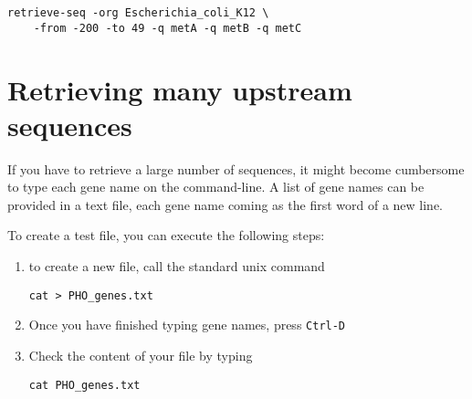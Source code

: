 {\color{blue} \begin{footnotesize}
\begin{verbatim}
retrieve-seq -org Escherichia_coli_K12 \
    -from -200 -to 49 -q metA -q metB -q metC
\end{verbatim} \end{footnotesize}
}

\section{Retrieving many upstream sequences}

If you have to retrieve a large number of sequences, it might become
cumbersome to type each gene name on the command-line. A list of gene
names can be provided in a text file, each gene name coming as the
first word of a new line.

To create a test file, you can execute the following steps:
\begin{enumerate}
\item to create a new file, call the standard unix command 

{\color{blue} \begin{footnotesize}
\begin{verbatim}
cat > PHO_genes.txt
\end{verbatim} \end{footnotesize}
} 


\item Once you have finished typing gene names, press \texttt{Ctrl-D}

\item Check the content of your file by typing 

{\color{blue} \begin{footnotesize}
\begin{verbatim}
cat PHO_genes.txt
\end{verbatim} \end{footnotesize}
} 

\end{enumerate}

